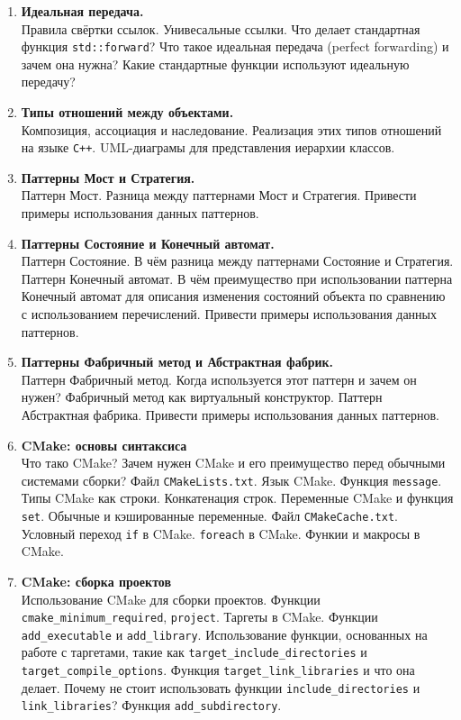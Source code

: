 \documentclass{article}
\begin{document}
\begin{enumerate}
\item \textbf{Идеальная передача.}\\
Правила свёртки ссылок. Унивесальные ссылки. Что делает стандартная функция \texttt{std::forward}? Что такое идеальная передача (perfect forwarding) и зачем она нужна? Какие стандартные функции используют идеальную передачу?



\item \textbf{Типы отношений между объектами.}\\
Композиция, ассоциация и наследование. Реализация этих типов отношений на языке \texttt{C++}. UML-диаграмы для представления иерархии классов.


\item \textbf{Паттерны Мост и Стратегия.}\\
Паттерн Мост. Разница между паттернами Мост и Стратегия. Привести примеры использования данных паттернов.


\item \textbf{Паттерны Состояние и Конечный автомат.}\\
Паттерн Состояние. В чём разница между паттернами Состояние и Стратегия. Паттерн Конечный автомат. В чём преимущество при использовании паттерна Конечный автомат для описания изменения состояний объекта по сравнению с использованием перечислений. Привести примеры использования данных паттернов.

\item \textbf{Паттерны Фабричный метод и Абстрактная фабрик.}\\
Паттерн Фабричный метод. Когда используется этот паттерн и зачем он нужен? Фабричный метод как виртуальный конструктор. Паттерн Абстрактная фабрика. Привести примеры использования данных паттернов.


\item \textbf{CMake: основы синтаксиса}\\
Что тако CMake? Зачем нужен CMake и его преимущество перед обычными системами сборки? Файл \texttt{CMakeLists.txt}. Язык CMake. Функция \texttt{message}. Типы CMake как строки. Конкатенация строк. Переменные CMake и функция \texttt{set}. Обычные и кэшированные переменные. Файл \texttt{CMakeCache.txt}. Условный переход \texttt{if} в CMake. \texttt{foreach} в CMake. Функии и макросы в CMake.

\item \textbf{CMake: сборка проектов}\\
Использование CMake для сборки проектов. Функции \texttt{cmake\_minimum\_required}, \texttt{project}. Таргеты в CMake. Функции \texttt{add\_executable} и \texttt{add\_library}. Использование функции, основанных на работе с таргетами, такие как \texttt{target\_include\_directories} и \texttt{target\_compile\_options}. Функция \texttt{target\_link\_libraries} и что она делает. Почему не стоит использовать функции \texttt{include\_directories} и \texttt{link\_libraries}? Функция \texttt{add\_subdirectory}. 


\end{enumerate}
\end{document}
